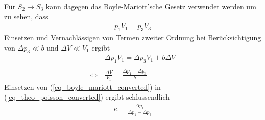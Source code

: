 \documentclass[12pt,a4paper,german]{scrartcl}
\numberwithin{equation}{section}
\begin{document}
  Für $S_2 \rightarrow S_3$ kann dagegen das Boyle-Mariott'sche Gesetz verwendet werden um zu sehen, dass
  \begin{align}
    p_1 V_1 = p_3 V_3
    \label{eq_theo_boyle_mariott}
  \end{align}
  Einsetzen und Vernachlässigen von Termen zweiter Ordnung bei Berücksichtigung von $\Delta p_3 \ll b$ und $\Delta V \ll V_1$ ergibt
  \begin{align}
    &\Delta p_1 V_1 = \Delta p_3 V_1 + b \Delta V \nonumber \\
    \nonumber \\
    \Leftrightarrow \ &\frac{\Delta V}{V_1} = \frac{\Delta p_1 - \Delta p_3}{b}
    \label{eq_boyle_mariott_converted}
  \end{align}
  Einsetzen von (\ref{eq_boyle_mariott_converted}) in (\ref{eq_theo_poisson_converted}) ergibt schlussendlich
  \begin{align}
    \kappa = \frac{\Delta p_1}{\Delta p_1 - \Delta p_3}
    \label{eq_theo_kappa_clement_desormes}
  \end{align}
\end{document}
